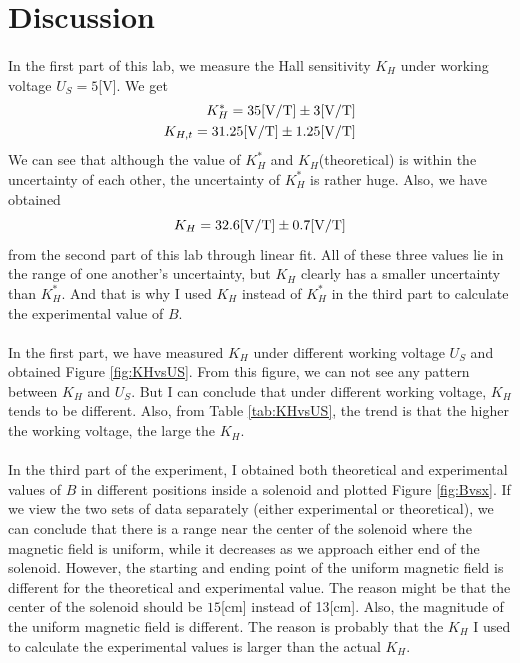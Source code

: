 \documentclass[a4paper]{article}
\begin{document}
    \section{Discussion}
    \paragraph{} In the first part of this lab, we measure the Hall sensitivity $K_H$ under working voltage $U_S=5$[V]. We get \begin{equation*}
        \begin{split}
            K_H^*=35[{\rm V/T}]\pm 3[{\rm V/T}]\\
            K_{H,t}=31.25[\rm V/T]\pm 1.25[V/T]
        \end{split}
    \end{equation*}
    We can see that although the value of $K_H^*$ and $K_H$(theoretical) is within the uncertainty of each other, the uncertainty of $K_H^*$ is rather huge. Also, we have obtained $$K_H=32.6[\rm V/T]\pm 0.7[V/T]$$ from the second part of this lab through linear fit. All of these three values lie in the range of one another's uncertainty, but $K_H$ clearly has a smaller uncertainty than $K_H^*$. And that is why I used $K_H$ instead of $K_H^*$ in the third part to calculate the experimental value of $B$.
    \vspace{-5mm}
    \paragraph{} In the first part, we have measured $K_H$ under different working voltage $U_S$ and obtained Figure \ref{fig:KHvsUS}. From this figure, we can not see any pattern between $K_H$ and $U_S$. But I can conclude that under different working voltage, $K_H$ tends to be different. Also, from Table \ref{tab:KHvsUS}, the trend is that the higher the working voltage, the large the $K_H$.
    \vspace{-5mm}
    \paragraph{} In the third part of the experiment, I obtained both theoretical and experimental values of $B$ in different positions inside a solenoid and plotted Figure \ref{fig:Bvsx}. If we view the two sets of data separately (either experimental or theoretical), we can conclude that there is a range near the center of the solenoid where the magnetic field is uniform, while it decreases as we approach either end of the solenoid. However, the starting and ending point of the uniform magnetic field is different for the theoretical and experimental value. The reason might be that the center of the solenoid should be $15$[cm] instead of 13[cm]. Also, the magnitude of the uniform magnetic field is different. The reason is probably that the $K_H$ I used to calculate the experimental values is larger than the actual $K_H$.
\end{document}
